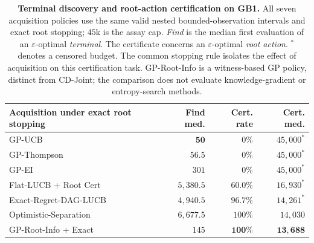 \documentclass{article}
\theoremstyle{plain}
\theoremstyle{definition}
\begin{document}
\begin{table}[!htbp]
\centering
\caption{\textbf{Terminal discovery and root-action certification on GB1.} All seven acquisition policies use the same valid nested bounded-observation intervals and exact root stopping; $45$k is the assay cap. \emph{Find} is the median first evaluation of an $\varepsilon$-optimal \emph{terminal}. The certificate concerns an $\varepsilon$-optimal \emph{root action}. $^*$ denotes a censored budget. The common stopping rule isolates the effect of acquisition on this certification task. GP-Root-Info is a witness-based GP policy, distinct from CD-Joint; the comparison does not evaluate knowledge-gradient or entropy-search methods.}
\label{tab:main-discovery-certificate}
\small
\renewcommand{\arraystretch}{0.95}
\setlength{\tabcolsep}{4.6pt}
\begin{tabular}{@{}lrrr@{}}
\toprule
\textbf{Acquisition under exact root stopping} & \textbf{Find med.} & \textbf{Cert. rate} & \textbf{Cert. med.}\\
\midrule
GP-UCB & $\mathbf{50}$ & $0\%$ & $45{,}000^*$\\
GP-Thompson & $56.5$ & $0\%$ & $45{,}000^*$\\
GP-EI & $301$ & $0\%$ & $45{,}000^*$\\
Flat-LUCB + Root Cert & $5{,}380.5$ & $60.0\%$ & $16{,}930^*$\\
Exact-Regret-DAG-LUCB & $4{,}940.5$ & $96.7\%$ & $14{,}261^*$\\
Optimistic-Separation & $6{,}677.5$ & $100\%$ & $14{,}030$\\
GP-Root-Info + Exact & $145$ & $\mathbf{100\%}$ & $\mathbf{13{,}688}$\\
\bottomrule
\end{tabular}
\vspace{-8pt}
\end{table}
\end{document}
